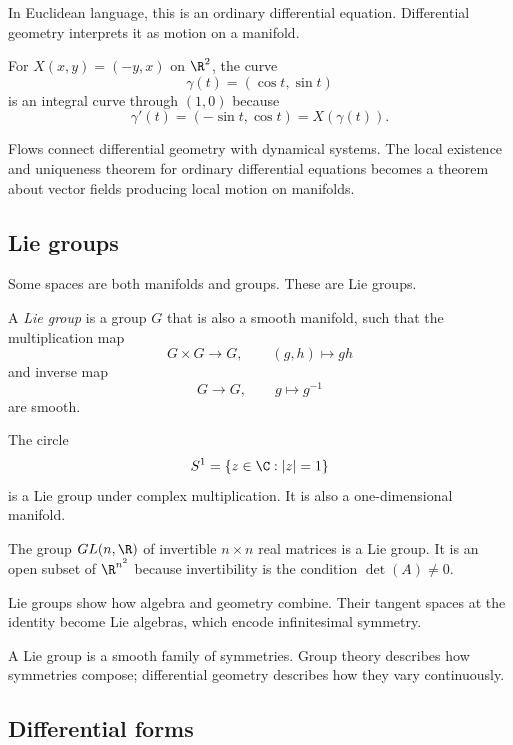 In Euclidean language, this is an ordinary differential equation. Differential
geometry interprets it as motion on a manifold.

\begin{example}
For $X(x,y)=(-y,x)$ on $\R^2$, the curve
\[
\gamma(t)=(\cos t,\sin t)
\]
is an integral curve through $(1,0)$ because
\[
\gamma'(t)=(-\sin t,\cos t)=X(\gamma(t)).
\]
\end{example}

Flows connect differential geometry with dynamical systems. The local existence
and uniqueness theorem for ordinary differential equations becomes a theorem
about vector fields producing local motion on manifolds.

\subsection{Lie groups}

Some spaces are both manifolds and groups. These are Lie groups.

\begin{definition}
A \emph{Lie group} is a group $G$ that is also a smooth manifold, such that the
multiplication map
\[
G\times G\to G,\qquad (g,h)\mapsto gh
\]
and inverse map
\[
G\to G,\qquad g\mapsto g^{-1}
\]
are smooth.
\end{definition}

\begin{example}
The circle
\[
S^1=\{z\in\C:|z|=1\}
\]
is a Lie group under complex multiplication. It is also a one-dimensional
manifold.
\end{example}

\begin{example}
The group $GL(n,\R)$ of invertible $n\times n$ real matrices is a Lie group.
It is an open subset of $\R^{n^2}$ because invertibility is the condition
$\det(A)\neq 0$.
\end{example}

Lie groups show how algebra and geometry combine. Their tangent spaces at the
identity become Lie algebras, which encode infinitesimal symmetry.

\begin{intuitionbox}
A Lie group is a smooth family of symmetries. Group theory describes how
symmetries compose; differential geometry describes how they vary continuously.
\end{intuitionbox}

\subsection{Differential forms}

